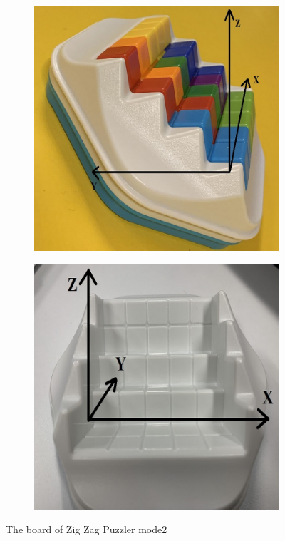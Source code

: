\begin{figure}[htbp]
\centering
\begin{subfigure}[b]{.45\textwidth}
\centering
\includegraphics[width=\textwidth]{figs/ZIGZAGmodel2board.jpg}
\caption{}
\label{fig:board2A}
\end{subfigure}
\begin{subfigure}[b]{.45\textwidth}
\centering
\includegraphics[width=\textwidth]{figs/3Dboard2.jpg}
\caption{}
\label{fig:board2B}
\end{subfigure}
\caption{The board of Zig Zag Puzzler mode2}
  \label{fig:board2}
\end{figure}
